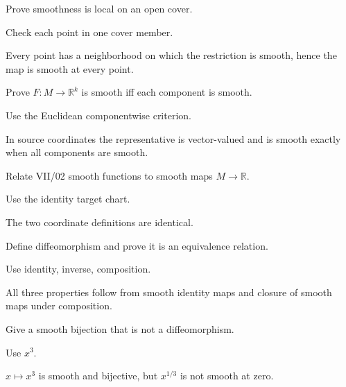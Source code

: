 \begin{exercise}\label{exr:vii03-06}
Prove smoothness is local on an open cover.
\end{exercise}
\begin{hint}
Check each point in one cover member.
\end{hint}
\begin{solution}
Every point has a neighborhood on which the restriction is smooth, hence the map is smooth at every point.
\end{solution}

\begin{exercise}\label{exr:vii03-07}
Prove \(F:M\to\mathbb R^k\) is smooth iff each component is smooth.
\end{exercise}
\begin{hint}
Use the Euclidean componentwise criterion.
\end{hint}
\begin{solution}
In source coordinates the representative is vector-valued and is smooth exactly when all components are smooth.
\end{solution}

\begin{exercise}\label{exr:vii03-08}
Relate VII/02 smooth functions to smooth maps \(M\to\mathbb R\).
\end{exercise}
\begin{hint}
Use the identity target chart.
\end{hint}
\begin{solution}
The two coordinate definitions are identical.
\end{solution}

\begin{exercise}\label{exr:vii03-09}
Define diffeomorphism and prove it is an equivalence relation.
\end{exercise}
\begin{hint}
Use identity, inverse, composition.
\end{hint}
\begin{solution}
All three properties follow from smooth identity maps and closure of smooth maps under composition.
\end{solution}

\begin{exercise}\label{exr:vii03-10}
Give a smooth bijection that is not a diffeomorphism.
\end{exercise}
\begin{hint}
Use \(x^3\).
\end{hint}
\begin{solution}
\(x\mapsto x^3\) is smooth and bijective, but \(x^{1/3}\) is not smooth at zero.
\end{solution}

